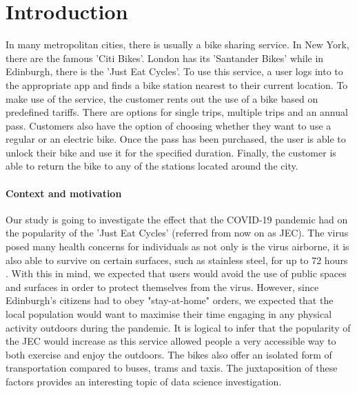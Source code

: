 \documentclass[11pt,a4paper]{article}
\begin{document}
\section{Introduction}

In many metropolitan cities, there is usually a bike sharing service. In New York, there are the famous 'Citi Bikes'. London has its 'Santander Bikes' while in Edinburgh, there is the 'Just Eat Cycles'. To use this service, a user logs into to the appropriate app and finds a bike station nearest to their current location. To make use of the service, the customer rents out the use of a bike based on predefined tariffs. There are options for single trips, multiple trips and an annual pass. Customers also have the option of choosing whether they want to use a regular or an electric bike. Once the pass has been purchased, the user is able to unlock their bike and use it for the specified duration. Finally, the customer is able to return the bike to any of the stations located around the city.

\paragraph{Context and motivation}

Our study is going to investigate the effect that the COVID-19 pandemic had on the popularity of the 'Just Eat Cycles' (referred from now on as JEC). The virus posed many health concerns for individuals as not only is the virus airborne, it is also able to survive on certain surfaces, such as stainless steel, for up to 72 hours \cite{Hammett1}. With this in mind, we expected that users would avoid the use of public spaces and surfaces in order to protect themselves from the virus. However, since Edinburgh's citizens had to obey "stay-at-home" orders, we expected that the local population would want to maximise their time engaging in any physical activity outdoors during the pandemic. It is logical to infer that the popularity of the JEC would increase as this service allowed people a very accessible way to both exercise and enjoy the outdoors. The bikes also offer an isolated form of transportation compared to buses, trams and taxis. The juxtaposition of these factors provides an interesting topic of data science investigation.  
\end{document}
